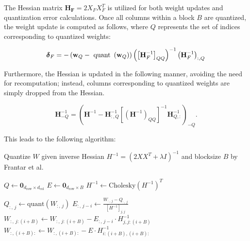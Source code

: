 The Hessian matrix $\mathbf{H_F} = 2X_FX_F^T$ is utilized for both weight updates and quantization error calculations. Once all columns within a block $B$ are quantized, the weight update is computed as follows, where $Q$ represents the set of indices corresponding to quantized weights:

\begin{equation}
    \boldsymbol{\delta}_F = -\left(\mathbf{w}_Q-\text { quant }\left(\mathbf{w}_Q\right)\right)\left(\left[\mathbf{H}_F^{-1}\right]_{Q Q}\right)^{-1}\left(\mathbf{H}_F^{-1}\right)_{:, Q} \\
    \label{eq:weight_update}
\end{equation}

Furthermore, the Hessian is updated in the following manner, avoiding the need for recomputation; instead, columns corresponding to quantized weights are simply dropped from the Hessian.

\begin{equation}
    \mathbf{H}_{-Q}^{-1} = \left(\mathbf{H}^{-1} - \mathbf{H}_{:, Q}^{-1}\left[\left(\mathbf{H}^{-1}\right)_{Q Q}\right]^{-1} \mathbf{H}_{Q,:}^{-1}\right)_{-Q}.
    \label{eq:hessian_upadte}
\end{equation}

This leads to the following algorithm:

\begin{algorithm}
    \caption{Quantize $W$ given inverse Hessian $H^{-1} = (2XX^T + \lambda I)^{-1}$ and blocksize $B$ by Frantar et al. \cite{frantar_gptq_2023}}
    \label{alg:quantize_W}
    \begin{algorithmic}[1]
    \State $Q \gets \mathbf{0}_{d_{\text{row}} \times d_{\text{col}}}$ 
    \State $E \gets \mathbf{0}_{d_{\text{row}} \times B}$ 
    \State $H^{-1} \gets \text{Cholesky}(H^{-1})^T$ 
    
            \State $Q_{:,\,j} \gets \text{quant}(W_{:,\,j})$ 
            \State $E_{:,\,j-i} \gets \frac{W_{:,\,j} - Q_{:,\,j}}{[H^{-1}]_{j,j}}$ 
            \State $W_{:,\,j:(i+B)} \gets W_{:,\,j:(i+B)} - E_{:,\,j-i} \cdot H^{-1}_{j,j:(i+B)}$ 
        \EndFor
        \State $W_{:,(i+B):} \gets W_{:,(i+B):} - E \cdot H^{-1}_{i:(i+B),(i+B):}$ 
    \EndFor
    \end{algorithmic}
\end{algorithm}

